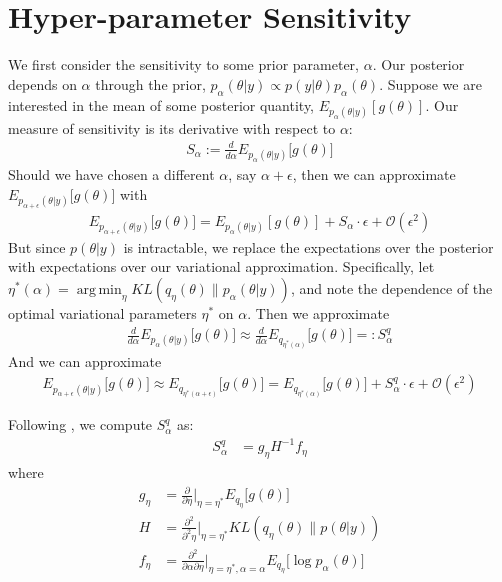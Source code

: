 \documentclass[a4paper]{article}
\DeclareMathOperator*{\argmin}{arg\,min}
\begin{document}
\section{Hyper-parameter Sensitivity}
We first consider the sensitivity to some prior parameter, $\alpha$. Our posterior depends on $\alpha$ through
the prior, $p_{\alpha}(\theta | y) \propto p(y |\theta) p_\alpha(\theta)$. Suppose we are interested in the mean of some posterior
quantity, $E_{p_{\alpha}(\theta | y)}[g(\theta)]$. Our measure of sensitivity is its derivative with respect to $\alpha$:
\begin{align}
  S_\alpha := \frac{d}{d\alpha}E_{p_{\alpha}(\theta | y)} \big[g(\theta)\big]
\end{align}
Should we have chosen a different $\alpha$, say $\alpha + \epsilon$, then we can approximate
$E_{p_{\alpha + \epsilon}(\theta | y)} \big[g(\theta)\big]$ with
\begin{align}
  E_{p_{\alpha + \epsilon}(\theta | y)} \big[g(\theta)\big] = E_{p_{\alpha}(\theta | y)}[g(\theta)] +
    S_\alpha \cdot \epsilon + \mathcal{O}(\epsilon^2)
\end{align}
But since $p(\theta | y)$ is intractable, we replace the expectations over the posterior with expectations over
our variational approximation. Specifically, let $\eta^*(\alpha) =
\argmin_\eta KL(q_\eta\left(\theta\right) \| p_{\alpha}(\theta | y))$, and note the
dependence of the optimal variational parameters $\eta^*$ on $\alpha$. Then we approximate
\begin{align}
  \frac{d}{d\alpha}E_{p_{\alpha}(\theta | y)} \big[g(\theta)\big] \approx
  \frac{d}{d\alpha}E_{q_{\eta^*(\alpha)}} \big[g(\theta)\big] =: S_\alpha^q
\end{align}
And we can approximate
\begin{align}
  E_{p_{\alpha + \epsilon}(\theta | y)} \big[g(\theta)\big] \approx E_{q_{\eta^*(\alpha + \epsilon)}} \big[g(\theta)\big] = E_{q_{\eta^*(\alpha)}}\big[g(\theta)\big] +
    S_\alpha^q \cdot \epsilon + \mathcal{O}(\epsilon^2)
    \label{eq:our_approximation}
\end{align}

Following \cite{giordano_2017},  we compute $S^q_\alpha$ as:
\begin{align}
  S^q_\alpha &=
    g_\eta H^{-1} f_\eta \label{eq:vb_sensitivty}
\end{align}
where
\begin{align}
  g_\eta &= \frac{\partial}{\partial \eta}\Big\rvert_{\eta = \eta^*} E_{q_{\eta}} \big[g(\theta)\big] \\
  H &= \frac{\partial^2}{\partial^2\eta}\Big\rvert_{\eta = \eta^*} KL(q_\eta\left(\theta\right) \| p(\theta | y)) \\
  f_\eta &= \frac{\partial^2}{\partial \alpha \partial \eta}\Big\rvert_{\eta = \eta^*, \alpha = \alpha} E_{q_{\eta}} \big[\log p_\alpha(\theta)\big]
\end{align}
\end{document}
